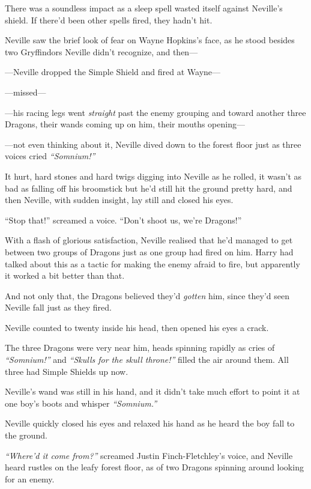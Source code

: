 There was a soundless impact as a sleep spell wasted itself against
Neville's shield. If there'd been other spells fired, they hadn't hit.

Neville saw the brief look of fear on Wayne Hopkins's face, as he stood
besides two Gryffindors Neville didn't recognize, and then---

---Neville dropped the Simple Shield and fired at Wayne---

---missed---

---his racing legs went \emph{straight} past the enemy grouping and
toward another three Dragons, their wands coming up on him, their mouths
opening---

---not even thinking about it, Neville dived down to the forest floor
just as three voices cried \emph{``Somnium!''}

It hurt, hard stones and hard twigs digging into Neville as he rolled,
it wasn't as bad as falling off his broomstick but he'd still hit the
ground pretty hard, and then Neville, with sudden insight, lay still and
closed his eyes.

``Stop that!'' screamed a voice. ``Don't shoot us, we're Dragons!''

With a flash of glorious satisfaction, Neville realised that he'd
managed to get between two groups of Dragons just as one group had fired
on him. Harry had talked about this as a tactic for making the enemy
afraid to fire, but apparently it worked a bit better than that.

And not only that, the Dragons believed they'd \emph{gotten} him, since
they'd seen Neville fall just as they fired.

Neville counted to twenty inside his head, then opened his eyes a crack.

The three Dragons were very near him, heads spinning rapidly as cries of
\emph{``Somnium!''} and \emph{``Skulls for the skull throne!''} filled
the air around them. All three had Simple Shields up now.

Neville's wand was still in his hand, and it didn't take much effort to
point it at one boy's boots and whisper \emph{``Somnium.''}

Neville quickly closed his eyes and relaxed his hand as he heard the boy
fall to the ground.

\emph{``Where'd it come from?''} screamed Justin Finch-Fletchley's
voice, and Neville heard rustles on the leafy forest floor, as of two
Dragons spinning around looking for an enemy.

